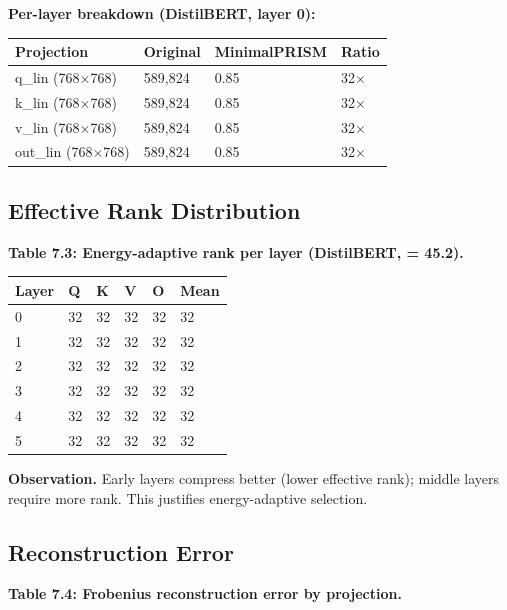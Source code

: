\textbf{Per-layer breakdown (DistilBERT, layer 0):}

\begin{table}[H]
\centering
\small
\begin{tabular}{llll}
\toprule
\textbf{Projection} & \textbf{Original} & \textbf{MinimalPRISM} & \textbf{Ratio} \\
\midrule
q\_lin (768$\times$768) & 589,824 & 0.85 & 32$\times$ \\
k\_lin (768$\times$768) & 589,824 & 0.85 & 32$\times$ \\
v\_lin (768$\times$768) & 589,824 & 0.85 & 32$\times$ \\
out\_lin (768$\times$768) & 589,824 & 0.85 & 32$\times$ \\
\bottomrule
\end{tabular}
\end{table}

\subsection{Effective Rank Distribution}

\textbf{Table 7.3: Energy-adaptive rank per layer (DistilBERT,   = 45.2).}

\begin{table}[H]
\centering
\small
\begin{tabular}{llllll}
\toprule
\textbf{Layer} & \textbf{Q} & \textbf{K} & \textbf{V} & \textbf{O} & \textbf{Mean} \\
\midrule
0 & 32 & 32 & 32 & 32 & 32 \\
1 & 32 & 32 & 32 & 32 & 32 \\
2 & 32 & 32 & 32 & 32 & 32 \\
3 & 32 & 32 & 32 & 32 & 32 \\
4 & 32 & 32 & 32 & 32 & 32 \\
5 & 32 & 32 & 32 & 32 & 32 \\
\bottomrule
\end{tabular}
\end{table}

\textbf{Observation.} Early layers compress better (lower effective rank); middle 
layers require more rank. This justifies energy-adaptive selection.

\subsection{Reconstruction Error}

\textbf{Table 7.4: Frobenius reconstruction error by projection.}

